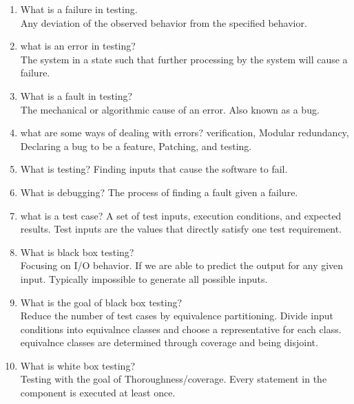 \documentclass[10pt]{article}
\begin{document}
\begin{enumerate}
    \item What is a failure in testing.\\
          Any deviation  of the observed behavior from the specified behavior.\\

    \item what is an error in testing?\\
          The system in a state such that further processing by the system will cause a failure.\\

    \item What is a fault in testing?\\
          The mechanical or algorithmic cause of an error. Also known as a bug.\\


    \item what are some ways of dealing with errors?
          verification, Modular redundancy, Declaring a bug to be a feature, Patching, and testing.

    \item What is testing?
          Finding inputs that cause the software to fail.

    \item What is debugging?
          The process of finding a fault given a failure.\\

    \item what is a test case?
          A set of test inputs, execution conditions, and expected results. Test inputs are the values that directly satisfy one test requirement.

    \item What is black box testing?\\
          Focusing on I/O behavior. If we are able to predict the output for any given input. Typically impossible to generate all possible inputs.\\
    \item What is the goal of black box testing?\\
          Reduce the number of test cases by equivalence partitioning. Divide input conditions into equivalnce classes and choose a representative for each class.\\
          equivalnce classes are determined through coverage and being disjoint.

    \item What is white box testing?\\
          Testing with the goal of Thoroughness/coverage. Every statement in the component is executed at least once.\\


\end{enumerate}
\end{document}
